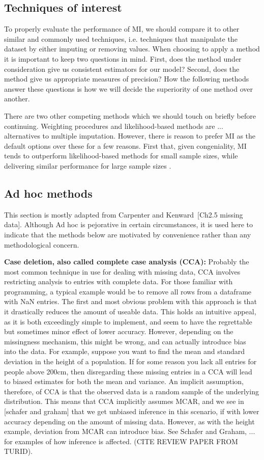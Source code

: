 \documentclass{article}
\begin{document}
	\subsection{Techniques of interest}
	To properly evaluate the performance of MI, we should compare it to other similar and commonly used techniques, i.e. techniques that manipulate the dataset by either imputing or removing values. When choosing to apply a method it is important to keep two questions in mind. First, does the method under consideration give us consistent estimators for our model? Second, does the method give us appropriate measures of precision? How the following methods answer these questions is how we will decide the superiority of one method over another.
	
	There are two other competing methods which we should touch on briefly before continuing. Weighting procedures and likelihood-based methods are ... alternatives to multiple imputation. However, there is reason to prefer MI as the default options over these for a few reasons. First that, given congeniality, MI tends to outperform likelihood-based methods for small sample sizes, while delivering similar performance for large sample sizes \cite{schafer_multiple_2016}.
	
	\subsection{Ad hoc methods}
	This section is mostly adapted from Carpenter and Kenward [Ch2.5 missing data]. Although Ad hoc is pejorative in certain circumstances, it is used here to indicate that the methods below are motivated by convenience rather than any methodological concern.
	
	\textbf{Case deletion, also called complete case analysis (CCA):}
	Probably the most common technique in use for dealing with missing data, CCA involves restricting analysis to entries with complete data. For those familiar with programming, a typical example would be to remove all rows from a dataframe with NaN entries. The first and most obvious problem with this approach is that it drastically reduces the amount of useable data. This holds an intuitive appeal, as it is both exceedingly simple to implement, and seem to have the regrettable but sometimes minor effect of lower accuracy. However, depending on the missingness mechanism, this might be wrong, and can actually introduce bias into the data. For example, suppose you want to find the mean and standard deviation in the height of a population. If for some reason you lack all entries for people above 200cm, then disregarding these missing entries in a CCA will lead to biased estimates for both the mean and variance. An implicit assumption, therefore, of CCA is that the observed data is a random sample of the underlying distribution. This means that CCA implicitly assumes MCAR, and we see in [schafer and graham] that we get unbiased inference in this scenario, if with lower accuracy depending on the amount of missing data. However, as with the height example, deviation from MCAR can introduce bias. See Schafer and Graham, ... for examples of how inference is affected. (CITE REVIEW PAPER FROM TURID). 
	
\end{document}
